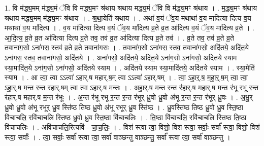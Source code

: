 \documentclass[17pt]{extarticle}
\begin{document}
1. वि म॑द्ध्य॒मम् म॑द्ध्य॒मं ॅवि वि म॑द्ध्य॒मꣳ श्र॑थाय श्रथाय मद्ध्य॒मं ॅवि वि म॑द्ध्य॒मꣳ श्र॑थाय । . म॒द्ध्य॒मꣳ श्र॑थाय श्रथाय मद्ध्य॒मम् म॑द्ध्य॒मꣳ श्र॑थाय । . श्र॒था॒येति॑ श्रथाय । . अथा॑ व॒यं ॅव॒य मथाथा॑ व॒य मा॑दित्या दित्य व॒य मथाथा॑ व॒य मा॑दित्य । . व॒य मा॑दित्या दित्य व॒यं ॅव॒य मा॑दित्य व्र॒ते व्र॒त आ॑दित्य व॒यं ॅव॒य मा॑दित्य व्र॒ते । . आ॒दि॒त्य॒ व्र॒ते व्र॒त आ॑दित्या दित्य व्र॒ते तव॒ तव॑ व्र॒त आ॑दित्या दित्य व्र॒ते तव॑ । . व्र॒ते तव॒ तव॑ व्र॒ते व्र॒ते तवाना॑ग॒सो ऽना॑गस॒ स्तव॑ व्र॒ते व्र॒ते तवाना॑गसः । . तवाना॑ग॒सो ऽना॑गस॒ स्तव॒ तवाना॑गसो॒ अदि॑तये॒ अदि॑त॒ये ऽना॑गस॒ स्तव॒ तवाना॑गसो॒ अदि॑तये । . अना॑गसो॒ अदि॑तये॒ अदि॑त॒ये ऽना॑ग॒सो ऽना॑गसो॒ अदि॑तये स्याम स्या॒मादि॑त॒ये ऽना॑ग॒सो ऽना॑गसो॒ अदि॑तये स्याम । . अदि॑तये स्याम स्या॒मादि॑तये॒ अदि॑तये स्याम । . स्या॒मेति॑ स्याम । . आ त्वा॒ त्वा ऽऽत्वा॑ ऽहार्.ष महार्.ष॒म् त्वा ऽऽत्वा॑ ऽहार्.षम् । . त्वा॒ ऽहा॒र्॒.ष॒ म॒हा॒र्॒.ष॒म् त्वा॒ त्वा॒ ऽहा॒र्॒.ष॒ म॒न्त र॒न्त र॑हार्.षम् त्वा त्वा ऽहार्.ष म॒न्तः । . अ॒हा॒र्॒.ष॒ म॒न्त र॒न्त र॑हार्.ष महार्.ष म॒न्त र॑भू रभू र॒न्त र॑हार्.ष महार्.ष म॒न्त र॑भूः । . अ॒न्त र॑भू रभू र॒न्त र॒न्त र॑भूर् ध्रु॒वो ध्रु॒वो अ॑भू र॒न्त र॒न्त र॑भूर् ध्रु॒वः । . अ॒भू॒र् ध्रु॒वो ध्रु॒वो अ॑भू रभूर् ध्रु॒व स्ति॑ष्ठ तिष्ठ ध्रु॒वो अ॑भू रभूर् ध्रु॒व स्ति॑ष्ठ । . ध्रु॒वस्ति॑ष्ठ तिष्ठ ध्रु॒वो ध्रु॒व स्ति॒ष्ठा वि॑चाचलि॒ रवि॑चाचलि स्तिष्ठ ध्रु॒वो ध्रु॒व स्ति॒ष्ठा वि॑चाचलिः । . ति॒ष्ठा वि॑चाचलि॒ रवि॑चाचलि स्तिष्ठ ति॒ष्ठा वि॑चाचलिः । . अवि॑चाचलि॒रित्यवि॑ - चा॒च॒लिः॒ । . विश॑ स्त्वा त्वा॒ विशो॒ विश॑ स्त्वा॒ सर्वाः॒ सर्वा᳚ स्त्वा॒ विशो॒ विश॑ स्त्वा॒ सर्वाः᳚ । . त्वा॒ सर्वाः॒ सर्वा᳚ स्त्वा त्वा॒ सर्वा॑ वाञ्छन्तु वाञ्छन्तु॒ सर्वा᳚ स्त्वा त्वा॒ सर्वा॑ वाञ्छन्तु । \newline
\end{document}
